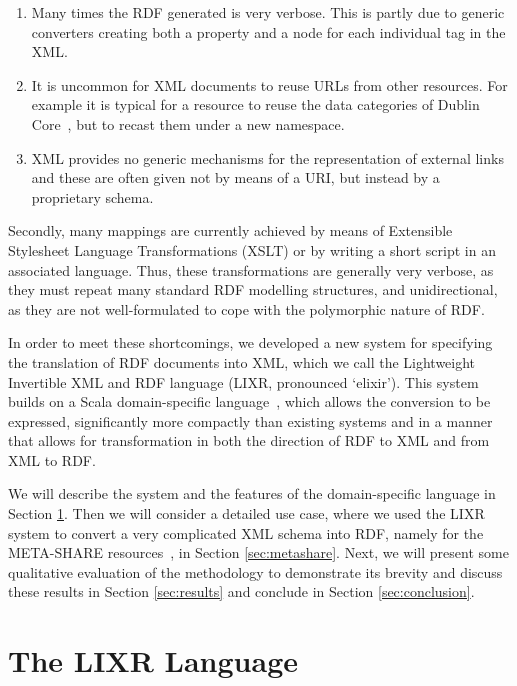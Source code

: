 \documentclass{acm_proc_article-sp}
\begin{document}
\begin{enumerate}
\item Many times the RDF generated is very verbose. This is partly due to generic
converters creating both a property and a node for each individual tag in the XML.
\item It is uncommon for XML documents to reuse URLs from other resources. For
example it is typical for a resource to reuse the data categories of Dublin Core~\cite{weibel1998dublin}, 
but to recast them under a new namespace.
\item XML provides no generic mechanisms for the representation of external links
and these are often given not by means of a URI, but instead by a proprietary schema.
\end{enumerate}

Secondly, many mappings are currently achieved by means of Extensible Stylesheet Language
Transformations (XSLT) or 
by writing a short script in an associated language. Thus, these transformations
are generally very verbose, as they must repeat many standard RDF modelling
structures, and unidirectional, as they are not well-formulated to cope with the 
polymorphic nature of RDF.

In order to meet these shortcomings, we developed a new system for specifying the
translation of RDF documents into XML, which we call the Lightweight Invertible
XML and RDF language (LIXR, pronounced `elixir'). This system builds on a 
Scala domain-specific language~\cite[DSL]{fowler2010domain,wampler2008programming}, which allows the conversion to be
expressed, significantly more compactly than existing systems and in a manner
that allows for transformation in both the direction of RDF to XML and from XML
to RDF.

We will describe the system and the features of the domain-specific language in Section
\ref{sec:dsl}. Then we will consider a detailed use case, where we used the LIXR
system to convert a very complicated XML schema into RDF, namely for the META-SHARE
resources~\cite{mccrae2015ontology,piperidis2012meta}, in Section \ref{sec:metashare}. Next, we will present some qualitative evaluation
of the methodology to demonstrate its brevity and discuss these results in Section
\ref{sec:results} and conclude in Section \ref{sec:conclusion}.

\section{The LIXR Language}
\label{sec:dsl}
\end{document}
